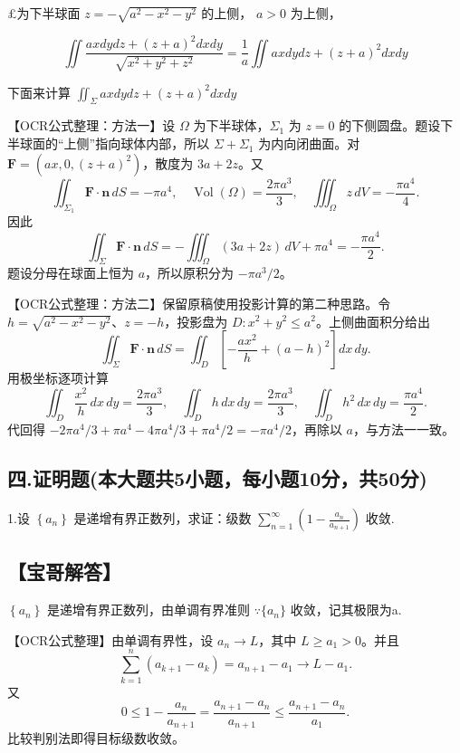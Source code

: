 \documentclass[11pt,fontset=fandol]{ctexart}
\begin{document}
£为下半球面 \(z = - \sqrt { a ^ { 2 } - x ^ { 2 } - y ^ { 2 } }\)
的上侧， \(a > 0\) 为上侧，

\[
\iint \frac { a x d y d z + ( z + a ) ^ { 2 } d x d y } { \sqrt { x ^ { 2 } + y ^ { 2 } + z ^ { 2 } } } = \frac { 1 } { a } \iint a x d y d z + ( z + a ) ^ { 2 } d x d y
\]

下面来计算
\(\iint _ { \Sigma } a x d y d z + ( z + a ) ^ { 2 } d x d y\)

【OCR公式整理：方法一】设 \(\Omega\) 为下半球体，\(\Sigma_1\) 为 \(z=0\)
的下侧圆盘。题设下半球面的``上侧''指向球体内部，所以 \(\Sigma+\Sigma_1\)
为内向闭曲面。对 \(\mathbf F=(ax,0,(z+a)^2)\)，散度为 \(3a+2z\)。又 \[
\iint_{\Sigma_1}\mathbf F\cdot\mathbf n\,dS=-\pi a^4,\quad
\operatorname{Vol}(\Omega)=\frac{2\pi a^3}{3},\quad
\iiint_\Omega z\,dV=-\frac{\pi a^4}{4}.
\] 因此 \[
\iint_\Sigma\mathbf F\cdot\mathbf n\,dS
=-\iiint_\Omega(3a+2z)\,dV+\pi a^4
=-\frac{\pi a^4}{2}.
\] 题设分母在球面上恒为 \(a\)，所以原积分为 \(-\pi a^3/2\)。

【OCR公式整理：方法二】保留原稿使用投影计算的第二种思路。令
\(h=\sqrt{a^2-x^2-y^2}\)、\(z=-h\)，投影盘为
\(D:x^2+y^2\le a^2\)。上侧曲面积分给出 \[
\iint_\Sigma\mathbf F\cdot\mathbf n\,dS
=\iint_D\left[-\frac{ax^2}{h}+(a-h)^2\right]dx\,dy.
\] 用极坐标逐项计算 \[
\iint_D\frac{x^2}{h}\,dx\,dy=\frac{2\pi a^3}{3},\quad
\iint_Dh\,dx\,dy=\frac{2\pi a^3}{3},\quad
\iint_Dh^2\,dx\,dy=\frac{\pi a^4}{2}.
\] 代回得
\(-2\pi a^4/3+\pi a^4-4\pi a^4/3+\pi a^4/2=-\pi a^4/2\)，再除以
\(a\)，与方法一一致。

\subsection{四.证明题(本大题共5小题，每小题10分，共50分)}\label{ux56db.ux8bc1ux660eux9898ux672cux5927ux9898ux51715ux5c0fux9898ux6bcfux5c0fux989810ux5206ux517150ux5206}

1.设 \(\left\{ a _ { n } \right\}\) 是递增有界正数列，求证：级数
\(\sum _ { n = 1 } ^ { \infty } ( 1 - \frac { a _ { n } } { a _ { n + 1 } } )\)
收敛.

\subsection{【宝哥解答】}\label{ux5b9dux54e5ux89e3ux7b54-4}

\(\left\{ a _ { n } \right\}\) 是递增有界正数列，由单调有界准则
\(\because \{ a _ { n } \}\) 收敛，记其极限为a.

【OCR公式整理】由单调有界性，设 \(a_n\to L\)，其中 \(L\ge a_1>0\)。并且
\[
\sum_{k=1}^n(a_{k+1}-a_k)=a_{n+1}-a_1\to L-a_1.
\] 又 \[
0\le1-\frac{a_n}{a_{n+1}}
=\frac{a_{n+1}-a_n}{a_{n+1}}
\le\frac{a_{n+1}-a_n}{a_1}.
\] 比较判别法即得目标级数收敛。
\end{document}
